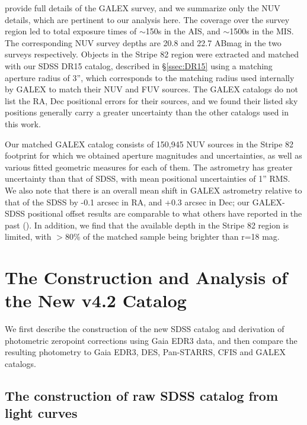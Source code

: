 \documentclass[fleqn,usenatbib]{mnras}
\begin{document}
\citet{2017ApJS..230...24B} provide full details of the GALEX survey, and we summarize only the NUV details, which are pertinent to our analysis here. The coverage over the survey region led to total exposure times of $\sim$150s in the AIS, and $\sim$1500s in the MIS. The corresponding NUV survey depths are 20.8 and 22.7 ABmag in the two surveys respectively. Objects in the Stripe 82 region were extracted and matched with our SDSS DR15 catalog, described in \S \ref{ssec:DR15} using a matching aperture radius of 3'', which corresponds to the matching radius used internally by GALEX to match their NUV and FUV sources. The GALEX catalogs do not list the RA, Dec positional errors for their sources, and we found their listed sky positions generally carry a greater uncertainty than the other catalogs used in this work.

Our matched GALEX catalog consists of 150,945 NUV sources in the Stripe 82 footprint for which we obtained aperture magnitudes and uncertainties, as well as various fitted geometric measures for each of them. The astrometry has greater uncertainty than that of SDSS, with mean positional uncertainties of 1'' RMS. We also note that there is an overall mean shift in GALEX astrometry relative to that of the SDSS by -0.1 arcsec in RA, and +0.3 arcsec in Dec; our GALEX-SDSS positional offset results are comparable to what others have reported in the past (\citealt{Ague2005, Morr2007, Hein2009, Bian2014}). In addition, we find that the available depth in the Stripe 82 region is limited, with $>$80\% of the matched sample being brighter than r=18 mag. 
  
 
\section{The Construction and Analysis of the New v4.2 Catalog \label{sec:v42}}

We first describe the construction of the new SDSS catalog and derivation of photometric
zeropoint corrections using Gaia EDR3 data, and then compare the resulting photometry to 
Gaia EDR3, DES, Pan-STARRS, CFIS and GALEX catalogs. 


\subsection{The construction of raw SDSS catalog from light curves \label{sec:averaging}} 
\end{document}
